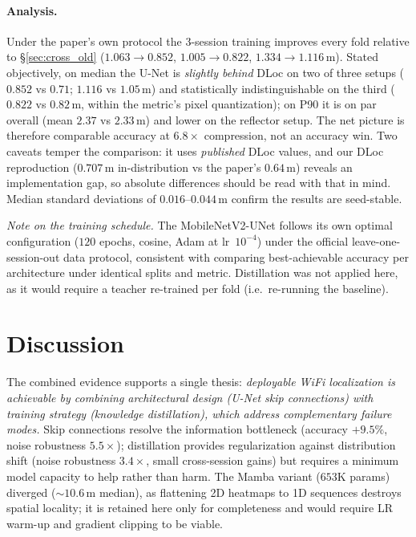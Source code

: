 \documentclass[11pt,a4paper]{article}
\begin{document}
\paragraph{Analysis.} Under the paper's own protocol the $3$-session training improves every fold
relative to \S\ref{sec:cross_old} ($1.063\!\to\!0.852$, $1.005\!\to\!0.822$,
$1.334\!\to\!1.116$\,m). Stated objectively, on median the U-Net is \emph{slightly behind} DLoc on
two of three setups ($0.852$ vs $0.71$; $1.116$ vs $1.05$\,m) and statistically indistinguishable
on the third ($0.822$ vs $0.82$\,m, within the metric's pixel quantization); on P90 it is on par
overall (mean $2.37$ vs $2.33$\,m) and lower on the reflector setup. The net picture is therefore
comparable accuracy at $6.8\times$ compression, not an accuracy win. Two caveats temper the
comparison: it uses \emph{published} DLoc values, and our DLoc reproduction ($0.707$\,m
in-distribution vs the paper's $0.64$\,m) reveals an implementation gap, so absolute differences
should be read with that in mind. Median standard deviations of $0.016$--$0.044$\,m confirm the
results are seed-stable.

\emph{Note on the training schedule.} The MobileNetV2-UNet follows its own optimal configuration
($120$ epochs, cosine, Adam at lr~$10^{-4}$) under the official leave-one-session-out data
protocol, consistent with comparing best-achievable accuracy per architecture under identical
splits and metric. Distillation was not applied here, as it would require a teacher re-trained per
fold (i.e.\ re-running the baseline).

\section{Discussion}
\label{sec:disc}

The combined evidence supports a single thesis: \emph{deployable WiFi localization is achievable by
combining architectural design (U-Net skip connections) with training strategy (knowledge
distillation), which address complementary failure modes.} Skip connections resolve the
information bottleneck (accuracy $+9.5\%$, noise robustness $5.5\times$); distillation provides
regularization against distribution shift (noise robustness $3.4\times$, small cross-session
gains) but requires a minimum model capacity to help rather than harm. The Mamba variant
($653$K params) diverged ($\sim$$10.6$\,m median), as flattening 2D heatmaps to 1D sequences
destroys spatial locality; it is retained here only for completeness and would require
LR warm-up and gradient clipping to be viable.
\end{document}
